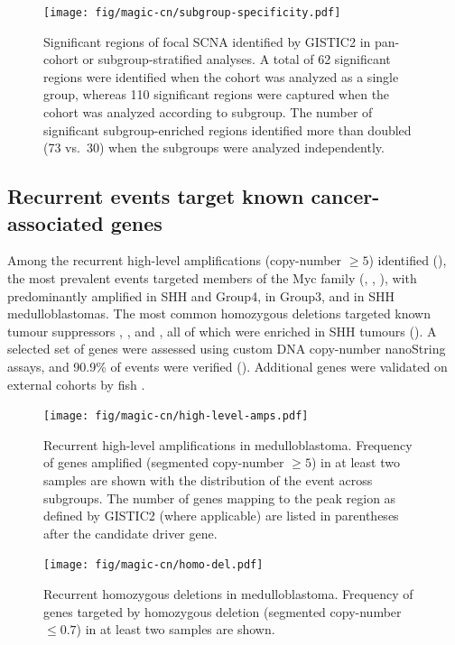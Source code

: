 \begin{figure}
	\centering
	\texttt{[image: fig/magic-cn/subgroup-specificity.pdf]}
	\caption[Significant regions of focal SCNA identified by GISTIC2]
	{
	Significant regions of focal SCNA identified by GISTIC2 in pan-cohort or subgroup-stratified analyses.
	A total of 62 significant regions were identified when the cohort was analyzed as a single group, whereas 110 significant regions were captured when the cohort was analyzed according to subgroup. The number of significant subgroup-enriched regions identified more than doubled (73 vs.\ 30) when the subgroups were analyzed independently.
	}
	\label{fig:subgroup-specificity}
\end{figure}

\subsection{Recurrent events target known cancer-associated genes}

Among the recurrent high-level amplifications (copy-number $\geq 5$) identified (), the most prevalent events targeted members of the Myc family (, , ), with  predominantly amplified in SHH and Group4,  in Group3, and  in SHH medulloblastomas. The most common homozygous deletions targeted known tumour suppressors , , and , all of which were enriched in SHH tumours (). A selected set of genes were assessed using custom DNA copy-number nanoString assays, and 90.9\% of events were verified (). Additional genes were validated on external cohorts by \gls{fish} .

\begin{figure}[5]
	\centering
	\texttt{[image: fig/magic-cn/high-level-amps.pdf]}
	\caption[Recurrent high-level amplifications in medulloblastoma]
	{
		Recurrent high-level amplifications in medulloblastoma.
		Frequency of genes amplified (segmented copy-number $\geq 5$) in at least two samples are shown with the distribution of the event across subgroups. The number of genes mapping to the peak region as defined by GISTIC2 (where applicable) are listed in parentheses after the candidate driver gene.
	}
	\label{fig:high-level-amps}
\end{figure}

\begin{figure}[5]
	\centering
	\texttt{[image: fig/magic-cn/homo-del.pdf]}
	\caption[Recurrent homozygous deletions in medulloblastoma]
	{
		Recurrent homozygous deletions in medulloblastoma.
		Frequency of genes targeted by homozygous deletion (segmented copy-number $\leq 0.7$) in at least two samples are shown.
	}
	\label{fig:homo-del}
\end{figure}

